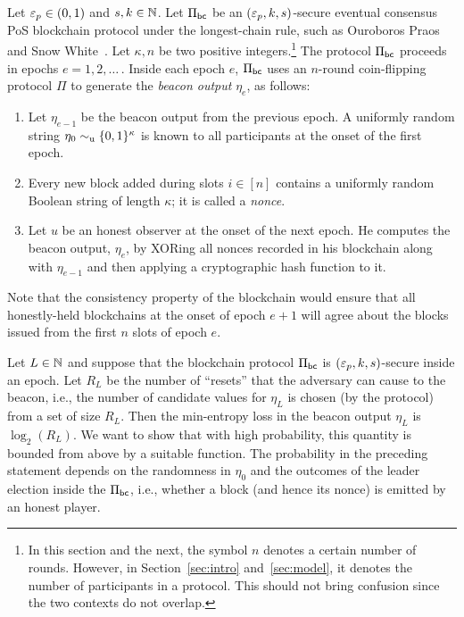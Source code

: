 
\newcommand{\Suffix}[2]{ \mathsf{suffix}({#1},{#2})}
\newcommand{\CoinTossingLC}{\Pi_\mathsf{lc}^{\Players(\alpha),k,n}}



Let $\mathsf{\varepsilon}_p \in (0,1)$ and $s, k \in \mathbb{N}$. 
Let $\Pi_\mathsf{bc}$ be an $(\mathsf{\varepsilon}_p, k, s)$-secure eventual consensus PoS blockchain protocol 
under the longest-chain rule, such as 
Ouroboros Praos~\cite{Praos} and Snow White~\cite{SnowWhite}. 
Let $\kappa, n$ be two positive integers.\footnote{\color{blue}In this section and the next, 
the symbol $n$ denotes a certain number of rounds. 
However, 
in Section~\ref{sec:intro} and~\ref{sec:model}, 
it denotes the number of participants in a protocol. 
This should not bring confusion since 
the two contexts do not overlap.}
The protocol $\Pi_\mathsf{bc}$ 
proceeds in epochs $e = 1, 2, \ldots$\,. 
Inside each epoch $e$, 
$\Pi_\mathsf{bc}$ uses 
an $n$-round 
coin-flipping protocol $\Pi$ 
to generate the \emph{beacon output} $\eta_e$, as follows: 
\begin{enumerate}
  \item Let $\eta_{e-1}$ be the 
  beacon output from the previous epoch. 
  A uniformly random string $\eta_0 \sim_{\mathrm{u}} \{0,1\}^\kappa$ is known to all participants at the onset of the first epoch. 

  \item Every new block added during slots $i \in [n]$ contains 
  a uniformly random Boolean string of length $\kappa$; 
  it is called a \emph{nonce}.

  \item Let $u$ be an honest observer at the onset of the next epoch. 
  He computes the beacon output, $\eta_e$, 
  by XORing all nonces recorded in his blockchain 
  along with $\eta_{e-1}$ 
  and then applying a cryptographic hash function to it.
\end{enumerate}
Note that the consistency property of the blockchain 
would ensure that all honestly-held blockchains 
at the onset of epoch $e + 1$ 
will agree about the blocks issued from 
the first $n$ slots of epoch $e$.

Let $L \in \mathbb{N}$ and suppose that 
the blockchain protocol $\Pi_\mathsf{bc}$ is $(\mathsf{\varepsilon}_p, k, s)$-secure 
inside an epoch. 
Let $R_L$ be the number of ``resets'' 
that the adversary can cause to the beacon, 
i.e., 
the number of candidate values for $\eta_L$ 
is chosen (by the protocol) 
from a set of size $R_L$. 
Then the min-entropy loss 
in the beacon output $\eta_L$ 
is $\log_2(R_L)$. 
We want to show that with high probability, 
this quantity is bounded from above by 
a suitable function. 
The probability in the preceding statement 
depends on 
the randomness in $\eta_0$ and 
the outcomes of the leader election inside the $\Pi_\mathsf{bc}$, 
i.e., whether a block (and hence its nonce) is emitted by an honest player.



